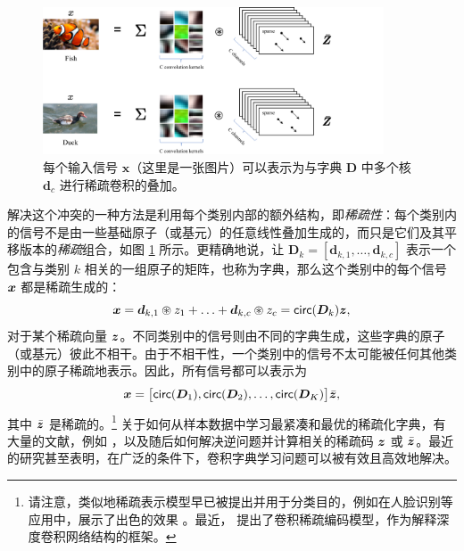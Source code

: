\documentclass[../../book-main.tex]{subfiles}
\begin{document}
\begin{figure}[t]
	\centerline{
\includegraphics[width=0.9\textwidth]{figs_chap4/sparse-representation.pdf}}
	\caption{每个输入信号 $\bm x$（这里是一张图片）可以表示为与字典 $\bm D$ 中多个核 $\bm d_c$ 进行稀疏卷积的叠加。}
	\label{fig:multi-channel-sparse-representation}
\end{figure}
解决这个冲突的一种方法是利用每个类别内部的额外结构，即{\em 稀疏性}：每个类别内的信号不是由一些基础原子（或基元）的任意线性叠加生成的，而只是它们及其平移版本的{\em 稀疏}组合，如图 \ref{fig:multi-channel-sparse-representation} 所示。更精确地说，让 $\bm D_k = [\bm d_{k,1}, \ldots, \bm d_{k,c}]$ 表示一个包含与类别 $k$ 相关的一组原子的矩阵，也称为字典，那么这个类别中的每个信号 $\bm{x}$ 都是稀疏生成的：
\begin{equation}
    \bm{x} = \bm d_{k,1} \circledast z_1 + \ldots + \bm d_{k,c} \circledast z_c = \mathsf{circ}(\bm{D}_k)\bm{z},
\end{equation}
对于某个稀疏向量 $\bm{z}$。不同类别中的信号则由不同的字典生成，这些字典的原子（或基元）彼此不相干。由于不相干性，一个类别中的信号不太可能被任何其他类别中的原子稀疏地表示。因此，所有信号都可以表示为
\begin{equation}
\bm{x} = \big[\mathsf{circ}(\bm{D}_1), \mathsf{circ}(\bm{D}_2), \ldots, \mathsf{circ}(\bm{D}_K)\big] \bar {\bm{z}},
\end{equation}
其中 $\bar {\bm{z}}$ 是稀疏的。\footnote{请注意，类似地稀疏表示模型早已被提出并用于分类目的，例如在人脸识别等应用中，展示了出色的效果 \cite{Wright:2009,wagner2012toward}。最近，\cite{papyan2017convolutional} 提出了卷积稀疏编码模型，作为解释深度卷积网络结构的框架。} 关于如何从样本数据中学习最紧凑和最优的稀疏化字典，有大量的文献，例如 \cite{li2019multichannel,qu2019nonconvex}，以及随后如何解决逆问题并计算相关的稀疏码 $\bm{z}$ 或 $\bar {\bm{z}}$。最近 \cite{qu2020nonconvex,Qu2020Geometric} 的研究甚至表明，在广泛的条件下，卷积字典学习问题可以被有效且高效地解决。
\end{document}

